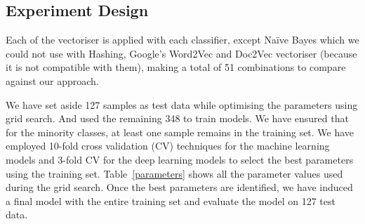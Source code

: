 \subsection{Experiment Design}
Each of the vectoriser is applied with each classifier, except Na\"ive Bayes which we could not use with Hashing, Google's Word2Vec and Doc2Vec vectoriser (because it is not compatible with them), making a total of 51 combinations to compare against our approach.

We have set aside 127 samples as test data while optimising the parameters using grid search. And used the remaining 348 to train models. We have ensured that for the minority classes, at least one sample remains in the training set. We have employed 10-fold cross validation (CV) techniques for the machine learning models and 3-fold CV for the deep learning models to select the best parameters using the training set. Table~\ref{parameters} shows all the parameter values used during the grid search. Once the best parameters are identified, we have induced a final model with the entire training set and evaluate the model on 127 test data.

